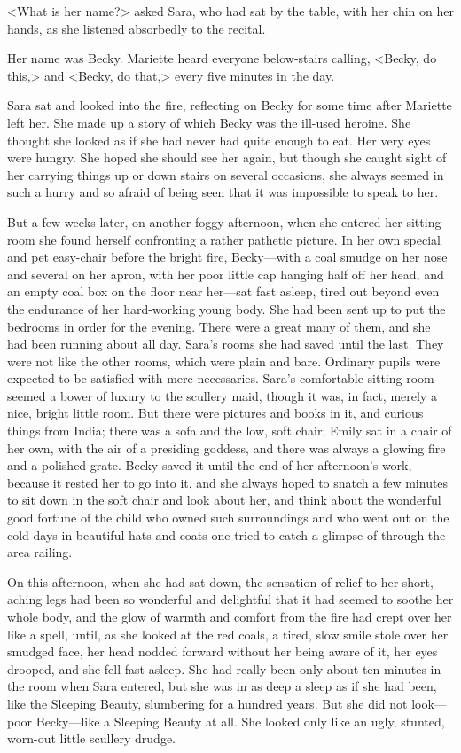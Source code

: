 <What is her name?> asked Sara, who had sat by the table, with her chin on her hands, as she listened absorbedly to the recital.

Her name was Becky. Mariette heard everyone below-stairs calling, <Becky, do this,> and <Becky, do that,> every five minutes in the day.

Sara sat and looked into the fire, reflecting on Becky for some time after Mariette left her. She made up a story of which Becky was the ill-used heroine. She thought she looked as if she had never had quite enough to eat. Her very eyes were hungry. She hoped she should see her again, but though she caught sight of her carrying things up or down stairs on several occasions, she always seemed in such a hurry and so afraid of being seen that it was impossible to speak to her.

But a few weeks later, on another foggy afternoon, when she entered her sitting room she found herself confronting a rather pathetic picture. In her own special and pet easy-chair before the bright fire, Becky—with a coal smudge on her nose and several on her apron, with her poor little cap hanging half off her head, and an empty coal box on the floor near her—sat fast asleep, tired out beyond even the endurance of her hard-working young body. She had been sent up to put the bedrooms in order for the evening. There were a great many of them, and she had been running about all day. Sara's rooms she had saved until the last. They were not like the other rooms, which were plain and bare. Ordinary pupils were expected to be satisfied with mere necessaries. Sara's comfortable sitting room seemed a bower of luxury to the scullery maid, though it was, in fact, merely a nice, bright little room. But there were pictures and books in it, and curious things from India; there was a sofa and the low, soft chair; Emily sat in a chair of her own, with the air of a presiding goddess, and there was always a glowing fire and a polished grate. Becky saved it until the end of her afternoon's work, because it rested her to go into it, and she always hoped to snatch a few minutes to sit down in the soft chair and look about her, and think about the wonderful good fortune of the child who owned such surroundings and who went out on the cold days in beautiful hats and coats one tried to catch a glimpse of through the area railing.

On this afternoon, when she had sat down, the sensation of relief to her short, aching legs had been so wonderful and delightful that it had seemed to soothe her whole body, and the glow of warmth and comfort from the fire had crept over her like a spell, until, as she looked at the red coals, a tired, slow smile stole over her smudged face, her head nodded forward without her being aware of it, her eyes drooped, and she fell fast asleep. She had really been only about ten minutes in the room when Sara entered, but she was in as deep a sleep as if she had been, like the Sleeping Beauty, slumbering for a hundred years. But she did not look—poor Becky—like a Sleeping Beauty at all. She looked only like an ugly, stunted, worn-out little scullery drudge.

